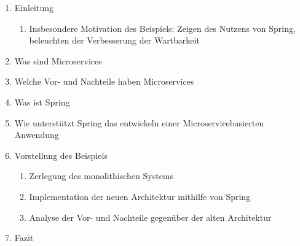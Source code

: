 \documentclass{article}
\begin{document}
\begin{enumerate}
    \item Einleitung
    \begin{enumerate}
        \item Insbesondere Motivation des Beispiels: Zeigen des Nutzens von Spring, beleuchten der Verbesserung der Wartbarkeit
    \end{enumerate}
    \item Was sind Microservices
    \item Welche Vor- und Nachteile haben Microservices
    \item Was ist Spring
    \item Wie unterstützt Spring das entwickeln einer Microservicebasierten Anwendung
    \item Vorstellung des Beispiels
    \begin{enumerate}
        \item Zerlegung des monolithischen Systems
        \item Implementation der neuen Architektur mithilfe von Spring
        \item Analyse der Vor- und Nachteile gegenüber der alten Architektur
    \end{enumerate}
    \item Fazit
\end{enumerate}
\end{document}
